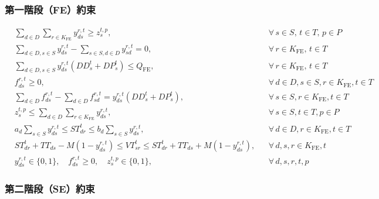 \documentclass[11pt, a4paper]{article}
\newcommand{\KFE}{K_{\mathrm{FE}}}
\newcommand{\QFE}{Q_{\mathrm{FE}}}
\numberwithin{equation}{section}
\begin{document}
\subsubsection{第一階段（FE）約束}

\begin{align}
  &\sum_{d\in D}\sum_{r\in\KFE}y_{ds}^{r,t} \ge z_s^{t,p},
  &&\forall\,s\in S,\,t\in T,\,p\in P
  \tag{C1}\label{c1}\\
  &\sum_{d\in D,s\in S}y_{ds}^{r,t}-\sum_{s\in S,d\in D}y_{sd}^{r,t}=0,
  &&\forall\,r\in\KFE,\,t\in T
  \tag{C2}\label{c2}\\
  &\sum_{d\in D,s\in S}y_{ds}^{r,t}(DD_s^t+DP_s^t)\le\QFE,
  &&\forall\,r\in\KFE,\,t\in T
  \tag{C3}\label{c3}\\
  &f_{ds}^{r,t}\ge 0,
  &&\forall\,d\in D,s\in S,r\in\KFE,t\in T
  \tag{C4a}\label{c4a}\\
  &\sum_{d\in D}f_{ds}^{r,t}-\sum_{d\in D}f_{sd}^{r,t}
    =y_{ds}^{r,t}(DD_s^t+DP_s^t),
  &&\forall\,s\in S,r\in\KFE,t\in T
  \tag{C4b}\label{c4b}\\
  &z_s^{t,p}\le\sum_{d\in D}\sum_{r\in\KFE}y_{ds}^{r,t},
  &&\forall\,s\in S,t\in T,p\in P
  \tag{C5}\label{c5}\\
  &a_d\sum_{s\in S}y_{ds}^{r,t}\le ST_{dr}^t\le b_d\sum_{s\in S}y_{ds}^{r,t},
  &&\forall\,d\in D,r\in\KFE,t\in T
  \tag{C6}\label{c6}\\
  &ST_{dr}^t+TT_{ds}-M(1-y_{ds}^{r,t})\le VT_{sr}^t
    \le ST_{dr}^t+TT_{ds}+M(1-y_{ds}^{r,t}),
  &&\forall\,d,s,r\in\KFE,t
  \tag{C7}\label{c7}\\
  &y_{ds}^{r,t}\in\{0,1\},\quad
  f_{ds}^{r,t}\ge 0,\quad
  z_s^{t,p}\in\{0,1\},
  &&\forall\,d,s,r,t,p
  \tag{C8}\label{c8}
\end{align}

\subsubsection{第二階段（SE）約束}
\end{document}
